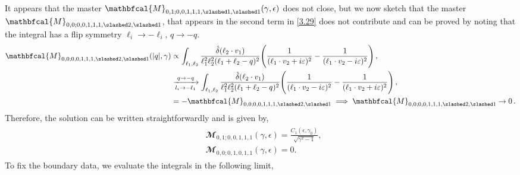 It appears that the master $\mathbfcal{M}_{0, 1; 0, 0, 1, 1, 1, \slashed 1, \slashed 1}(\gamma,\epsilon)$ does not close, but we now sketch that the master $\mathbfcal{M}_{0, 0; 0, 0, 1, 1, 1, \slashed 2, \slashed 1}$, that appears in the second term in \eqref{3.29} does not contribute and can be proved by noting that the integral has a flip symmetry $\ell_i\to -\ell_i,\,q\to -q$.
\begin{align}
\begin{split}
    \mathbfcal{M}_{0, 0; 0, 0, 1, 1, 1, \slashed 2, \slashed 1}(|q|,\gamma)&\propto \int_{\ell_{1},\ell_{2}}\frac{\hat\delta(\ell_{2}\cdot v_1)}{\ell_{1}^2 \ell_{2}^2 (\ell_{1}+\ell_{2}-q)^2}\Bigg(\frac{1}{(\ell_{1}\cdot v_2+i\varepsilon)^2}-\frac{1}{(\ell_{1}\cdot v_2-i\varepsilon)^2}\Bigg)\,,\\ &\xrightarrow[l_i\to -\ell_{1}]{q\to -q}\int_{\ell_{1},\ell_{2}}\frac{\hat\delta(\ell_{2}\cdot v_1)}{\ell_{1}^2 \ell_{2}^2 (\ell_{1}+\ell_{2}-q)^2}\Bigg(\frac{1}{(\ell_{1}\cdot v_2-i\varepsilon)^2}-\frac{1}{(\ell_{1}\cdot v_2+i\varepsilon)^2}\Bigg)\,,\\ &
    =-  \mathbfcal{M}_{0, 0; 0, 0, 1, 1, 1, \slashed 2, \slashed 1}\implies   \mathbfcal{M}_{0, 0; 0, 0, 1, 1, 1, \slashed 2, \slashed 1}\to 0\,.
    \end{split}
\end{align}
Therefore, the solution can be written straightforwardly and is given by,
\begin{align}
    \begin{split}
     &   \mathbfcal{M}_{0, 1; 0, 0, 1, 1, 1}(\gamma,\epsilon)=\frac{C_1(\epsilon,\gamma_0)}{\sqrt{\gamma^2-1}},
     \\ &
   \mathbfcal{M}_{0,0;0,1,0,1,1}(\gamma,\epsilon)  =0. \label{MasterC}
    \end{split}
\end{align}
To fix the boundary data, we evaluate the integrals in the following limit,
